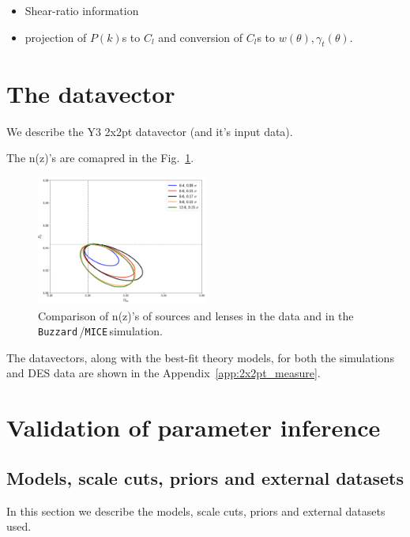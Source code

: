 \documentclass[fleqn,usenatbib]{mnras}
\newcommand{\mice}{\texttt{MICE}\,}
\newcommand{\buzzard}{\texttt{Buzzard}\,}
\begin{document}
    

\begin{itemize}
    \item Shear-ratio information
    
    \item projection of $P(k)$s to $C_l$ and conversion of $C_l$s to $w(\theta),\gamma_t(\theta)$.
\end{itemize}



\section{The datavector}
We describe the Y3 2x2pt datavector (and it's input data).

The n(z)'s are comapred in the Fig.~\ref{fig:nz_comp}.

\begin{figure}
\includegraphics[width=0.5\textwidth,draft]{figs/temp.png}
\caption[]{Comparison of n(z)'s of sources and lenses in the data and in the \buzzard/\mice simulation. }
\label{fig:nz_comp}
\end{figure}

The datavectors, along with the best-fit theory models, for both the simulations and DES data are shown in the Appendix~\ref{app:2x2pt_measure}. 

\section{Validation of parameter inference}

\subsection{Models, scale cuts, priors and external datasets}
In this section we describe the models, scale cuts, priors and external datasets used.
\end{document}
